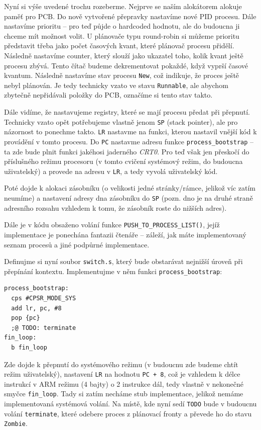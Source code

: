 \documentclass{article}
\begin{document}
Nyní si výše uvedené trochu rozeberme. Nejprve se naším alokátorem alokuje paměť pro PCB. Do nově vytvořené přepravky nastavíme nové PID procesu. Dále nastavíme prioritu -- pro teď půjde o hardcoded hodnotu, ale do budoucna ji chceme mít možnost volit. U plánovače typu round-robin si můžeme prioritu představit třeba jako počet časových kvant, které plánovač procesu přidělí. Následně nastavíme counter, který slouží jako ukazatel toho, kolik kvant ještě procesu zbývá. Tento čítač budeme dekrementovat pokaždé, když vyprší časové kvantum. Následně nastavíme stav procesu \texttt{New}, což indikuje, že proces ještě nebyl plánován. Je tedy technicky vzato ve stavu \texttt{Runnable}, ale abychom zbytečně nepřidávali položky do PCB, označíme si tento stav takto.

Dále vidíme, že nastavujeme registry, které se mají procesu předat při přepnutí. Technicky vzato opět potřebujeme vlastně jenom \texttt{SP} (stack pointer), ale pro názornost to ponechme takto. \texttt{LR} nastavme na funkci, kterou nastavil vnější kód k provádění v tomto procesu. Do \texttt{PC} nastavme adresu funkce \texttt{process\_bootstrap} -- ta zde bude plnit funkci jakéhosi jaderného \emph{CRT0}. Pro teď však jen přeskočí do příslušného režimu procesoru (v tomto cvičení systémový režim, do budoucna uživatelský) a provede  na adresu v \texttt{LR}, a tedy vyvolá uživatelský kód.

Poté dojde k alokaci zásobníku (o velikosti jedné stránky/rámce, jelikož víc zatím neumíme) a nastavení adresy dna zásobníku do \texttt{SP} (pozn. dno je na druhé straně adresního rozsahu vzhledem k tomu, že zásobník roste do nižších adres).

Dále je v kódu obsaženo volání funkce \texttt{PUSH\_TO\_PROCESS\_LIST()}, jejíž implementace je ponechána fantazii čtenáře -- záleží, jak máte implementovaný seznam procesů a jiné podpůrné implementace.

Definujme si nyní soubor \texttt{switch.s}, který bude obstarávat nejnižší úroveň při přepínání kontextu. Implementujme v něm funkci \texttt{process\_bootstrap}:

\begin{lstlisting}
process_bootstrap:
  cps #CPSR_MODE_SYS
  add lr, pc, #8
  pop {pc}
  ;@ TODO: terminate
fin_loop:
  b fin_loop
\end{lstlisting}

Zde dojde k přepnutí do systémového režimu (v budoucnu zde budeme chtít režim uživatelský), nastavení \texttt{LR} na hodnotu \texttt{PC + 8}, což je vzhledem k délce instrukcí v ARM režimu (4 bajty) o 2 instrukce dál, tedy vlastně v nekonečné smyčce \texttt{fin\_loop}. Tady si zatím necháme stub implementace, jelikož nemáme implementovaná systémová volání. Na místě, kde nyní sedí \texttt{TODO} bude v budoucnu volání \texttt{terminate}, které odebere proces z plánovací fronty a převede ho do stavu \texttt{Zombie}.
\end{document}
